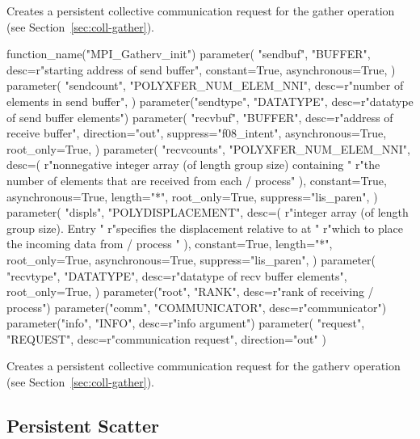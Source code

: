 Creates a persistent collective communication request for the gather operation
(see Section~\ref{sec:coll-gather}).

\begin{mpi-binding}
    function_name("MPI_Gatherv_init")
    parameter(
        "sendbuf",
        "BUFFER",
        desc=r"starting address of send buffer",
        constant=True,
        asynchronous=True,
    )
    parameter(
        "sendcount",
        "POLYXFER_NUM_ELEM_NNI",
        desc=r"number of elements in send buffer",
    )
    parameter("sendtype", "DATATYPE", desc=r"datatype of send buffer elements")
    parameter(
        "recvbuf",
        "BUFFER",
        desc=r"address of receive buffer",
        direction="out",
        suppress="f08_intent",
        asynchronous=True,
        root_only=True,
    )
    parameter(
        "recvcounts",
        "POLYXFER_NUM_ELEM_NNI",
        desc=(
            r"nonnegative integer array (of length group size) containing "
            r"the number of elements that are received from each \MPI/ process"
        ),
        constant=True,
        asynchronous=True,
        length="*",
        root_only=True,
        suppress="lis_paren",
    )
    parameter(
        "displs",
        "POLYDISPLACEMENT",
        desc=(
            r"integer array (of length group size). Entry  "
            r"specifies the displacement relative to  at "
            r"which to place the incoming data from \MPI/ process "
        ),
        constant=True,
        length="*",
        root_only=True,
        asynchronous=True,
        suppress="lis_paren",
    )
    parameter(
        "recvtype",
        "DATATYPE",
        desc=r"datatype of recv buffer elements",
        root_only=True,
    )
    parameter("root", "RANK", desc=r"rank of receiving \MPI/ process")
    parameter("comm", "COMMUNICATOR", desc=r"communicator")
    parameter("info", "INFO", desc=r"info argument")
    parameter(
        "request", "REQUEST", desc=r"communication request", direction="out"
    )
\end{mpi-binding}

Creates a persistent collective communication request for the gatherv operation
(see Section~\ref{sec:coll-gather}).

\subsection{Persistent Scatter}
\label{sec:pcoll-scatter}

